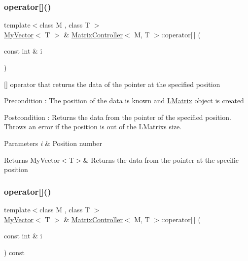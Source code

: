 \subsubsection{\texorpdfstring{operator[]()}{operator[]()}\hspace{0.1cm}{\footnotesize\ttfamily [1/2]}}
{\footnotesize\ttfamily template$<$class M , class T $>$ \\
\mbox{\hyperlink{class_my_vector}{My\+Vector}}$<$ T $>$ \& \mbox{\hyperlink{class_matrix_controller}{Matrix\+Controller}}$<$ M, T $>$\+::operator\mbox{[}$\,$\mbox{]} (\begin{DoxyParamCaption}\item[{const int \&}]{i }\end{DoxyParamCaption})}



\mbox{[}\mbox{]} operator that returns the data of the pointer at the specified position 

\begin{DoxyPrecond}{Precondition}
\+: The position of the data is known and \mbox{\hyperlink{class_l_matrix}{L\+Matrix}} object is created 
\end{DoxyPrecond}
\begin{DoxyPostcond}{Postcondition}
\+: Returns the data from the pointer of the specified position. Throws an error if the position is out of the \mbox{\hyperlink{class_l_matrix}{L\+Matrix}}\textquotesingle{}s size. 
\end{DoxyPostcond}

\begin{DoxyParams}{Parameters}
{\em i} & Position number \\
\hline
\end{DoxyParams}
\begin{DoxyReturn}{Returns}
My\+Vector$<$\+T$>$\& Returns the data from the pointer at the specific position 
\end{DoxyReturn}
\mbox{\label{class_matrix_controller_a59cfd6e10abd1a90fa0a1090bb4de240}} 
\subsubsection{\texorpdfstring{operator[]()}{operator[]()}\hspace{0.1cm}{\footnotesize\ttfamily [2/2]}}
{\footnotesize\ttfamily template$<$class M , class T $>$ \\
\mbox{\hyperlink{class_my_vector}{My\+Vector}}$<$ T $>$ \& \mbox{\hyperlink{class_matrix_controller}{Matrix\+Controller}}$<$ M, T $>$\+::operator\mbox{[}$\,$\mbox{]} (\begin{DoxyParamCaption}\item[{const int \&}]{i }\end{DoxyParamCaption}) const}



